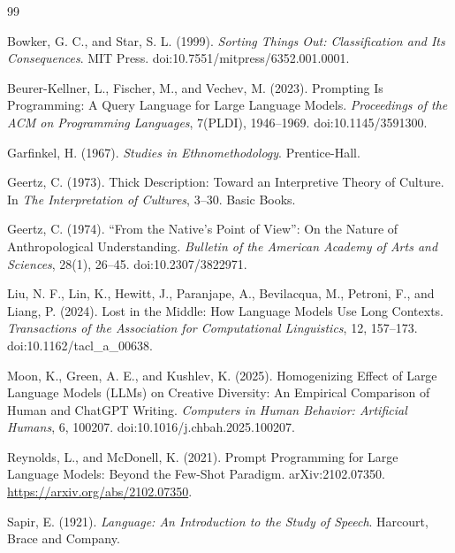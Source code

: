 \documentclass[11pt]{article}
\begin{document}
\begin{thebibliography}{99}

Bowker, G. C., and Star, S. L. (1999).
\newblock \emph{Sorting Things Out: Classification and Its Consequences}.
\newblock MIT Press. doi:10.7551/mitpress/6352.001.0001.

Beurer-Kellner, L., Fischer, M., and Vechev, M. (2023).
\newblock Prompting Is Programming: A Query Language for Large Language Models.
\newblock \emph{Proceedings of the ACM on Programming Languages}, 7(PLDI), 1946--1969. doi:10.1145/3591300.

Garfinkel, H. (1967).
\newblock \emph{Studies in Ethnomethodology}.
\newblock Prentice-Hall.

Geertz, C. (1973).
\newblock Thick Description: Toward an Interpretive Theory of Culture.
\newblock In \emph{The Interpretation of Cultures}, 3--30. Basic Books.

Geertz, C. (1974).
\newblock ``From the Native's Point of View'': On the Nature of Anthropological Understanding.
\newblock \emph{Bulletin of the American Academy of Arts and Sciences}, 28(1), 26--45. doi:10.2307/3822971.

Liu, N. F., Lin, K., Hewitt, J., Paranjape, A., Bevilacqua, M., Petroni, F., and Liang, P. (2024).
\newblock Lost in the Middle: How Language Models Use Long Contexts.
\newblock \emph{Transactions of the Association for Computational Linguistics}, 12, 157--173. doi:10.1162/tacl\_a\_00638.

Moon, K., Green, A. E., and Kushlev, K. (2025).
\newblock Homogenizing Effect of Large Language Models (LLMs) on Creative Diversity: An Empirical Comparison of Human and ChatGPT Writing.
\newblock \emph{Computers in Human Behavior: Artificial Humans}, 6, 100207. doi:10.1016/j.chbah.2025.100207.

Reynolds, L., and McDonell, K. (2021).
\newblock Prompt Programming for Large Language Models: Beyond the Few-Shot Paradigm.
\newblock arXiv:2102.07350. \url{https://arxiv.org/abs/2102.07350}.

Sapir, E. (1921).
\newblock \emph{Language: An Introduction to the Study of Speech}.
\newblock Harcourt, Brace and Company.


\end{thebibliography}
\end{document}
